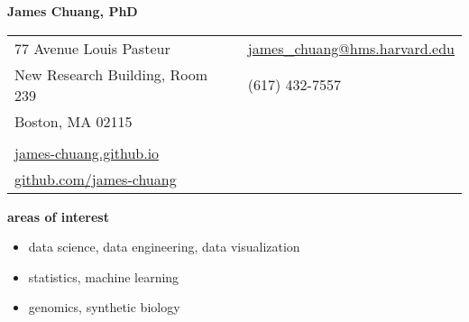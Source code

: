 \documentclass[11pt, a4paper]{article}
\begin{document}
\textbf{\LARGE James Chuang, PhD}

\vspace{0.6cm}

\begin{tabularx}{13 cm}{@{}Xl}
    77 Avenue Louis Pasteur & \href{mailto:james_chuang@hms.harvard.edu}{james\_chuang@hms.harvard.edu} \\
    New Research Building, Room 239 & (617) 432-7557                                                     \\
    Boston, MA 02115        &                                                                           \\
    \\
    \href{https://james-chuang.github.io}{james-chuang.github.io} \\
    \href{https://github.com/james-chuang}{github.com/james-chuang} \\
\end{tabularx}

\vspace{1.5em}
\noindent\hrulefill
\vspace{1.5em}

\textbf{\Large areas of interest}
\begin{itemize}[topsep=0em, align=right, leftmargin=!]
    \item data science, data engineering, data visualization
    \item statistics, machine learning
    \item genomics, synthetic biology
\end{itemize}
\end{document}
